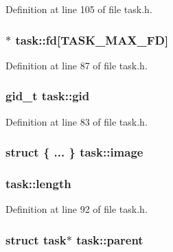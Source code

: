 Definition at line 105 of file task.\+h.

\hypertarget{structtask_afeeb6bafaefe505e6a730dd4e0be5a1a}{
\subsubsection[{fd}]{$\ast$ task\+::fd\mbox{[}{\bf T\+A\+S\+K\+\_\+\+M\+A\+X\+\_\+\+F\+D}\mbox{]}}}\label{structtask_afeeb6bafaefe505e6a730dd4e0be5a1a}


Definition at line 87 of file task.\+h.

\hypertarget{structtask_aaf3b6e15445e766a5c4823b815bca630}{
\subsubsection[{gid}]{\setlength{\rightskip}{0pt plus 5cm}gid\+\_\+t task\+::gid}}\label{structtask_aaf3b6e15445e766a5c4823b815bca630}


Definition at line 83 of file task.\+h.

\hypertarget{structtask_a3eac6c8a544ff49a836c5eed9ec48107}{
\subsubsection[{image}]{\setlength{\rightskip}{0pt plus 5cm}struct \{ ... \}   task\+::image}}\label{structtask_a3eac6c8a544ff49a836c5eed9ec48107}
\hypertarget{structtask_aa90dc3e7e232d6ba3f04700b3197b366}{
\subsubsection[{length}]{ task\+::length}}\label{structtask_aa90dc3e7e232d6ba3f04700b3197b366}


Definition at line 92 of file task.\+h.

\hypertarget{structtask_a34c6613744820a1e8127756fb6a5392c}{
\subsubsection[{parent}]{\setlength{\rightskip}{0pt plus 5cm}struct {\bf task}$\ast$ task\+::parent}}\label{structtask_a34c6613744820a1e8127756fb6a5392c}


